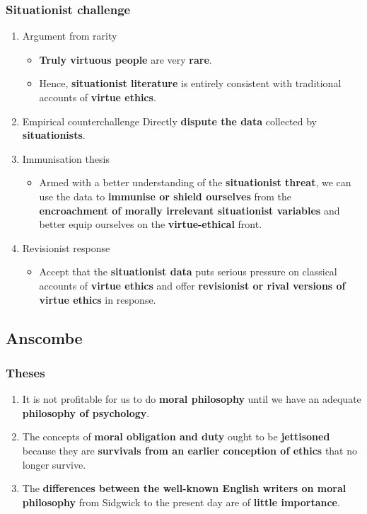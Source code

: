 \documentclass[11pt]{article}
\begin{document}
\subsubsection{Situationist challenge}
\label{sec:org4de1cea}
\begin{enumerate}
\item Argument from rarity
\begin{itemize}
\item \textbf{Truly virtuous people} are very \textbf{rare}.
\item Hence, \textbf{situationist literature} is entirely consistent with traditional accounts of \textbf{virtue ethics}.
\end{itemize}
\item Empirical counterchallenge
Directly \textbf{dispute the data} collected by \textbf{situationists}.
\item Immunisation thesis
\begin{itemize}
\item Armed with a better understanding of the \textbf{situationist threat}, we can use the data to \textbf{immunise or shield ourselves} from the \textbf{encroachment of morally irrelevant situationist variables} and better equip ourselves on the \textbf{virtue-ethical} front.
\end{itemize}
\item Revisionist response
\begin{itemize}
\item Accept that the \textbf{situationist data} puts serious pressure on classical accounts of \textbf{virtue ethics} and offer \textbf{revisionist or rival versions of virtue ethics} in response.
\end{itemize}
\end{enumerate}

 \newpage
\subsection{Anscombe}
\label{sec:org3da6036}

\subsubsection{Theses}
\label{sec:org1799dbc}
\begin{enumerate}
\item It is not profitable for us to do \textbf{moral philosophy} until we have an adequate \textbf{philosophy of psychology}.
\item The concepts of \textbf{moral obligation and duty} ought to be \textbf{jettisoned} because they are \textbf{survivals from an earlier conception of ethics} that no longer survive.
\item The \textbf{differences between the well-known English writers on moral philosophy} from Sidgwick to the present day are of \textbf{little importance}.
\end{enumerate}
\end{document}
